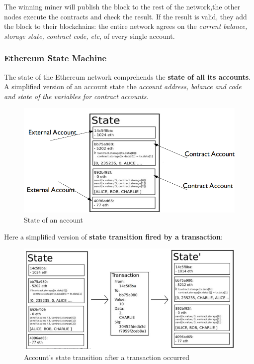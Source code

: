 \documentclass[10pt,a4paper]{report}
\begin{document}
The winning miner will publish the block to the rest of the network,the other nodes execute the contracts and check the result. If the result is valid, they add the block to their blockchains: the entire network agrees on the \textit{current balance, storage state, contract code, etc}, of every single account.
\subsubsection{Ethereum State Machine}\label{sec:ethereum-state-machine}
The state of the Ethereum network comprehends the \textbf{state of all its accounts}. A simplified version of an account state the \textit{account address, balance and code and state of the variables for contract accounts.}
\begin{figure}[h]
	\centering
	\includegraphics[scale=0.50]{images/Pasted image 20230417122348.png}
	\caption{State of an account}\n\end{figure}

Here a simplified version of \textbf{state transition fired by a transaction}:
\begin{figure}[h]
	\centering
	\includegraphics[scale=0.50]{images/Pasted image 20230417122434.png}
	\caption{Account's state transition after a transaction occurred}\n\end{figure}
\end{document}
